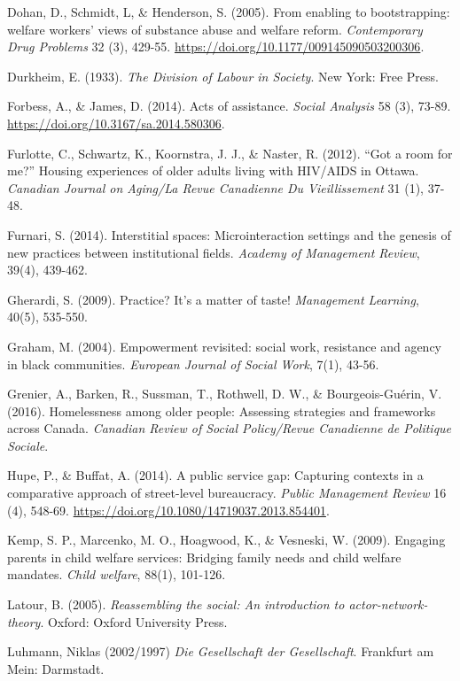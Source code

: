 \begin{thebibliography}{99}
\item Dohan, D., Schmidt, L, \& Henderson, S. (2005). From enabling to bootstrapping: welfare workers’ views of substance abuse and welfare reform. \textit{Contemporary Drug Problems} 32 (3), 429-55. \url{https://doi.org/10.1177/009145090503200306}.
\item Durkheim, E. (1933). \textit{The Division of Labour in Society}. New York: Free Press.
\item Forbess, A., \& James, D. (2014). Acts of assistance. \textit{Social Analysis} 58 (3), 73-89. \url{https://doi.org/10.3167/sa.2014.580306}.
\item Furlotte, C., Schwartz, K., Koornstra, J. J., \& Naster, R. (2012). “Got a room for me?” Housing experiences of older adults living with HIV/AIDS in Ottawa. \textit{Canadian Journal on Aging/La Revue Canadienne Du Vieillissement} 31 (1), 37-48.
\item Furnari, S. (2014). Interstitial spaces: Microinteraction settings and the genesis of new practices between institutional fields. \textit{Academy of Management Review}, 39(4), 439-462.
\item Gherardi, S. (2009). Practice? It’s a matter of taste! \textit{Management Learning}, 40(5), 535-550.
\item Graham, M. (2004). Empowerment revisited: social work, resistance and agency in black communities. \textit{European Journal of Social Work}, 7(1), 43-56.
\item Grenier, A., Barken, R., Sussman, T., Rothwell, D. W., \& Bourgeois-Guérin, V. (2016). Homelessness among older people: Assessing strategies and frameworks across Canada. \textit{Canadian Review of Social Policy/Revue Canadienne de Politique Sociale}. 
\item Hupe, P., \& Buffat, A. (2014). A public service gap: Capturing contexts in a comparative approach of street-level bureaucracy. \textit{Public Management Review} 16 (4), 548-69. \url{https://doi.org/10.1080/14719037.2013.854401}.
\item Kemp, S. P., Marcenko, M. O., Hoagwood, K., \& Vesneski, W. (2009). Engaging parents in child welfare services: Bridging family needs and child welfare mandates. \textit{Child welfare}, 88(1), 101-126. 
\item Latour, B. (2005). \textit{Reassembling the social: An introduction to actor-network-theory}. Oxford: Oxford University Press.
\item Luhmann, Niklas (2002/1997) \textit{Die Gesellschaft der Gesellschaft}. Frankfurt am Mein: Darmstadt.

\end{thebibliography}
